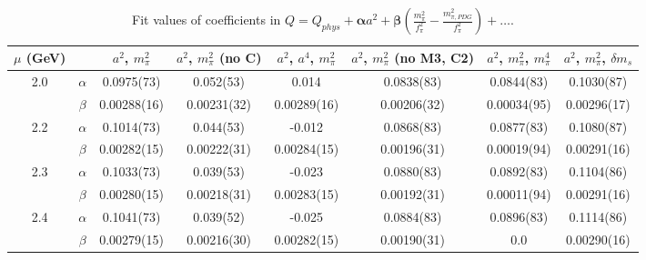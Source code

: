 \documentclass[12pt]{extarticle}
\begin{document}
\begin{table}[h!]
\begin{center}
\begin{tabular}{|c c|c|c|c|c|c|c|}
\hline
$\mu$ (GeV) &  & $a^2$, $m_\pi^2$& $a^2$, $m_\pi^2$ (no C)& $a^2$, $a^4$, $m_\pi^2$& $a^2$, $m_\pi^2$ (no M3, C2)& $a^2$, $m_\pi^2$, $m_\pi^4$& $a^2$, $m_\pi^2$, $\delta m_s$\\
\hline
\multirow{2}{0.5in}{2.0} & $\alpha$ & 0.0975(73)& 0.052(53)& 0.014& 0.0838(83)& 0.0844(83)& 0.1030(87)\\
 & $\beta$ & 0.00288(16)& 0.00231(32)& 0.00289(16)& 0.00206(32)& 0.00034(95)& 0.00296(17)\\
\hline
\multirow{2}{0.5in}{2.2} & $\alpha$ & 0.1014(73)& 0.044(53)& -0.012& 0.0868(83)& 0.0877(83)& 0.1080(87)\\
 & $\beta$ & 0.00282(15)& 0.00222(31)& 0.00284(15)& 0.00196(31)& 0.00019(94)& 0.00291(16)\\
\hline
\multirow{2}{0.5in}{2.3} & $\alpha$ & 0.1033(73)& 0.039(53)& -0.023& 0.0880(83)& 0.0892(83)& 0.1104(86)\\
 & $\beta$ & 0.00280(15)& 0.00218(31)& 0.00283(15)& 0.00192(31)& 0.00011(94)& 0.00291(16)\\
\hline
\multirow{2}{0.5in}{2.4} & $\alpha$ & 0.1041(73)& 0.039(52)& -0.025& 0.0884(83)& 0.0896(83)& 0.1114(86)\\
 & $\beta$ & 0.00279(15)& 0.00216(30)& 0.00282(15)& 0.00190(31)& 0.0& 0.00290(16)\\
\hline
\end{tabular}
\caption{Fit values of coefficients in $Q = Q_{phys} + \mathbf{\alpha} a^2 + \mathbf{\beta}\left(\frac{m_\pi^2}{f_\pi^2}-\frac{m_{\pi,PDG}^2}{f_\pi^2}\right) + \ldots$.}
\end{center}
\end{table}
























\clearpage
\end{document}

